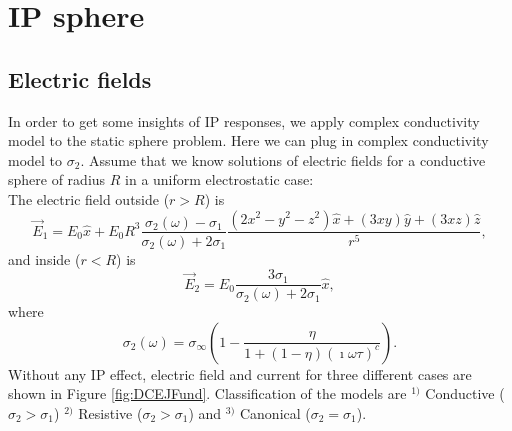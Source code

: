 \documentclass[a4paper, 11pt]{article}
\newcommand {\E}{{\vec E}}
\newcommand{\siginf}{\sigma_\infty}
\begin{document}
\graphicspath{{./IPFigures/}}


\section{IP sphere}


\subsection{Electric fields}
In order to get some insights of IP responses, we apply complex conductivity model to the static sphere problem.
Here we can plug in complex conductivity model to $\sigma_2$. Assume that we know solutions of electric fields for a conductive sphere of radius $R$ in a uniform electrostatic case: \\
The electric field outside ($r>R$) is 
\begin{equation}
	\E_1 = E_0\hat{x}+E_0R^3\frac{\sigma_2(\omega)-\sigma_1}{\sigma_2(\omega)+2\sigma_1}\frac{(2x^2-y^2-z^2)\hat{x}+(3xy)\hat{y}+(3xz)\hat{z}}{r^5},
\label{eq:IPspheq1}		
\end{equation}
and inside ($r<R$) is
\begin{equation}
	\E_2 = E_0\frac{3\sigma_1}{\sigma_2(\omega)+2\sigma_1}\hat{x},
\label{eq:IPspheq2}		
\end{equation}
where 
\begin{displaymath}
	\sigma_2(\omega) = \siginf(1-\frac{\eta}{1+(1-\eta)(\imath\omega\tau)^c}).
\end{displaymath}
Without any IP effect, electric field and current for three different cases are shown in Figure \ref{fig:DCEJFund}. Classification of the models are $^{1)}$ Conductive ($\sigma_2 > \sigma_1$) $^{2)}$ Resistive ($\sigma_2 > \sigma_1$) and $^{3)}$ Canonical ($\sigma_2 = \sigma_1$). 
\end{document}
